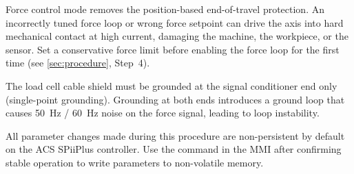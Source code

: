 \bigskip

\begin{warningbox}
  Force control mode removes the position-based end-of-travel protection.
  An incorrectly tuned force loop or wrong force setpoint can drive the
  axis into hard mechanical contact at high current, damaging the machine,
  the workpiece, or the sensor.  Set a conservative force limit before
  enabling the force loop for the first time (see \cref{sec:procedure},
  Step~4).
\end{warningbox}

\bigskip

\begin{cautionbox}
  The load cell cable shield must be grounded at the signal conditioner end
  only (single-point grounding).  Grounding at both ends introduces a
  ground loop that causes \SI{50}{\hertz} / \SI{60}{\hertz} noise on the
  force signal, leading to loop instability.
\end{cautionbox}

\bigskip

\begin{notebox}
  All parameter changes made during this procedure are non-persistent by
  default on the ACS SPiiPlus controller.  Use the  command in the MMI after confirming stable operation to
  write parameters to non-volatile memory.
\end{notebox}
